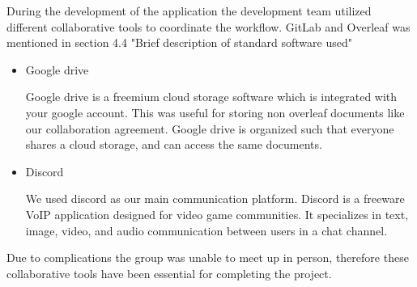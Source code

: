             During the development of the application the development team utilized different collaborative tools to coordinate the workflow. GitLab and Overleaf was mentioned in section 4.4 "Brief description of standard software used"
 
            \begin{itemize}
                
                \item Google drive
                
                Google drive is a freemium cloud storage software which is integrated with your google account. \cite{website:GDrive} This was useful for storing non overleaf documents like our collaboration agreement. Google drive is organized such that everyone shares a cloud storage, and can access the same documents. 
                
                \item Discord
                
                We used discord as our main communication platform. Discord is a freeware VoIP application designed for video game communities. It specializes in text, image, video, and audio communication between users in a chat channel. \cite{website:digitaltrends}

            \end{itemize}{}
            Due to complications the group was unable to meet up in person, therefore these collaborative tools have been essential for completing the project.
